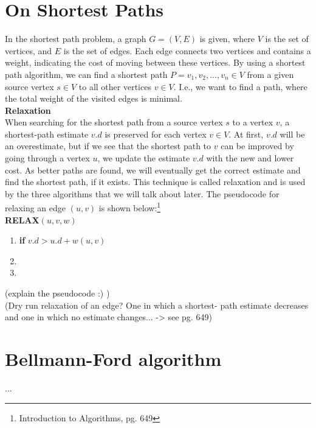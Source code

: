 \documentclass[11pt]{article}
\begin{document}
\section{On Shortest Paths}
In the shortest path problem, a graph $G = (V,E)$ is given, where $V$
is the set of vertices, and $E$ is the set of edges. Each edge
connects two vertices and contains a weight, indicating the cost of
moving between these vertices. By using a shortest path algorithm, we
can find a shortest path $P = {v_{1}, v_{2}, ..., v_{n}} \in V$ from a
given source vertex $s \in V$ to all other vertices $v \in V$. I.e.,
we want to find a path, where the total weight of the visited edges is
minimal.\\

\noindent
\textbf{Relaxation}\\
When searching for the shortest path from a source vertex $s$ to a
vertex $v$, a shortest-path estimate $v.d$ is preserved for each
vertex $v \in V$. At first, $v.d$ will be an overestimate, but if we see that the shortest path to $v$ can be improved by going through a vertex $u$, we update the estimate $v.d$ with the new and lower cost. As better paths are found, we will eventually get the correct estimate and find the shortest path, if it exists. This technique is called relaxation and is used by the three algorithms that we will talk about later. The pseudocode for relaxing an edge $(u,v) $ is shown below:\footnote{Introduction to Algorithms, pg. 649}\\

\textbf{RELAX$(u, v, w)$}
\begin{enumerate}
\setlength\itemsep{0em}
\item \textbf{if } $v.d > u.d + w(u,v)$
\item {}
\item {}
\end{enumerate}
(explain the pseudocode :) )\\

\noindent
(Dry run relaxation of an edge? One in which a shortest- path estimate decreases and one in which no estimate changes... -> see pg. 649)\\


\section{Bellmann-Ford algorithm}
...\\
\end{document}
